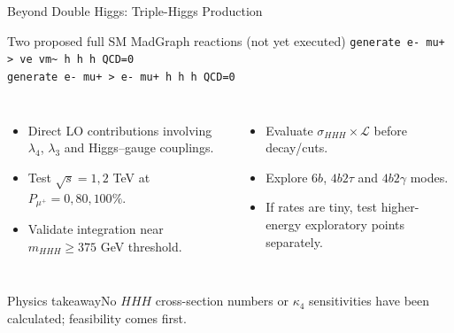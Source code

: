 \documentclass[aspectratio=1610,english]{beamer}
\newcommand{\src}[1]{\vfill{\par\color{black!65}\fontsize{6.4}{7.4}\selectfont\emph{Source:} #1\par}}
\newcommand{\key}[1]{\begin{alertblock}{Physics takeaway}\small  #1\end{alertblock}}
\begin{document}
\begin{frame}[t]{Beyond Double Higgs: Triple-Higgs Production}
\small

\begin{block}{Two proposed full SM MadGraph reactions (not yet executed)}
\texttt{generate e- mu+ > ve vm\textasciitilde{} h h h QCD=0}\\[.45em]
\texttt{generate e- mu+ > e- mu+ h h h QCD=0}
\end{block}
\begin{columns}%
\begin{itemize}
\justifying 
\item Direct LO contributions involving $\lambda_4$, $\lambda_3$ and Higgs--gauge couplings.
\item Test $\sqrt{s}=1,2$ TeV at $P_{\mu^+}=0,80,100\%$.
\item Validate integration near $m_{HHH}\geq375$ GeV threshold.
\end{itemize}
\begin{itemize}
\justifying 
\item Evaluate $\sigma_{HHH}\times\mathcal L$ before decay/cuts.
\item Explore $6b$, $4b2\tau$ and $4b2\gamma$ modes.
\item If rates are tiny, test higher-energy exploratory points separately.
\end{itemize}
\end{columns}

\key{No $HHH$ cross-section numbers or $\kappa_4$ sensitivities have been calculated; feasibility comes first.}

\end{frame}
\end{document}
